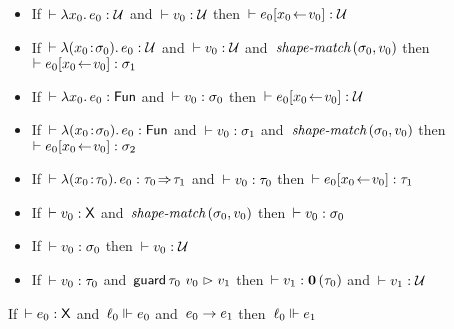 \documentclass[nonacm,10pt]{acmart}
\begin{document}
\begin{lemma}\leavevmode
  \begin{itemize}
    \item
      If\ $\vdash \lambda x_0.\, e_0 : \mathcal{U}$
      and\ $\vdash v_0 : \mathcal{U}$
      then\ $\vdash e_0[x_0\!\leftarrow\!v_0] : \mathcal{U}$
    \item
      If\ $\vdash \lambda (x_0\!:\!\sigma_0).\, e_0 : \mathcal{U}$
      and\ $\vdash v_0 : \mathcal{U}$
      and\ $\textit{shape-match}\,(\sigma_0, v_0)$
      then\ $\vdash e_0[x_0\!\leftarrow\!v_0] : \sigma_1$
    \item
      If\ $\vdash \lambda x_0.\, e_0 : \mathsf{Fun}$
      and\ $\vdash v_0 : \sigma_0$
      then\ $\vdash e_0[x_0\!\leftarrow\!v_0] : \mathcal{U}$
    \item
      If\ $\vdash \lambda (x_0\!:\!\sigma_0).\, e_0 : \mathsf{Fun}$
      and\ $\vdash v_0 : \sigma_1$
      and\ $\textit{shape-match}\,(\sigma_0, v_0)$
      then\ $\vdash e_0[x_0\!\leftarrow\!v_0] : \sigma_2$
    \item
      If\ $\vdash \lambda (x_0\!:\!\tau_0).\, e_0 : \tau_0\!\Rightarrow\!\tau_1$
      and\ $\vdash v_0 : \tau_0$
      then\ $\vdash e_0[x_0\!\leftarrow\!v_0] : \tau_1$
  \end{itemize}
\end{lemma}

\begin{lemma}[boundary]\leavevmode
  \begin{itemize}
    \item
      If\ $\vdash v_0 : \mathsf{X}$
      and\ $\textit{shape-match}\,(\sigma_0, v_0)$
      then\ $\vdash v_0 : \sigma_0$
    \item
      If\ $\vdash v_0 : \sigma_0$
      then\ $\vdash v_0 : \mathcal{U}$
    \item
      If\ $\vdash v_0 : \tau_0$
      and\ $\mathsf{guard}\,\tau_0~v_0 \vartriangleright v_1$
      then\ $\vdash v_1 : \mathbf{0}\,(\tau_0)$
      and\ $\vdash v_1 : \mathcal{U}$
  \end{itemize}
\end{lemma}

\begin{lemma}
  If\ $\vdash e_0 : \mathsf{X}$
  and\ $\ell_0 \Vdash e_0$
  and\ $e_0 \rightarrow e_1$
  then\ $\ell_0 \Vdash e_1$
\end{lemma}
\end{document}
